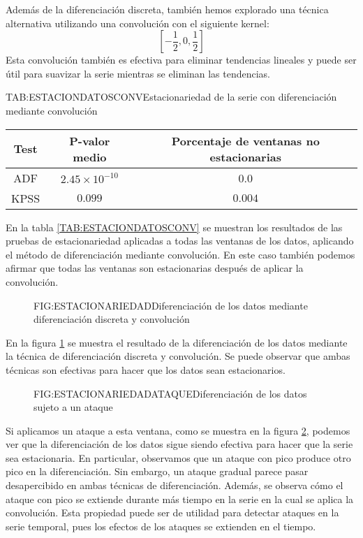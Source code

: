 Además de la diferenciación discreta, también hemos explorado una técnica alternativa utilizando una convolución con el siguiente kernel:
\[
[-\frac{1}{2}, 0, \frac{1}{2}]
\]
Esta convolución también es efectiva para eliminar tendencias lineales y puede ser útil para suavizar la serie mientras se eliminan las tendencias.

\begin{table}[Estacionariedad de la serie con diferenciación mediante convolución]{TAB:ESTACIONDATOSCONV}{Estacionariedad de la serie con diferenciación mediante convolución}
    \begin{tabular}{|c|c|c|}
        \hline
        \textbf{Test} & \textbf{P-valor medio} & \textbf{Porcentaje de ventanas no estacionarias} \\
        \hline
        ADF & $2.45\times 10^{-10}$ & 0.0 \\
        KPSS & $0.099$ & $0.004$ \\
        \hline
    \end{tabular}
\end{table}

En la tabla \ref{TAB:ESTACIONDATOSCONV} se muestran los resultados de las pruebas de estacionariedad aplicadas a todas las ventanas de los datos, aplicando el método de diferenciación mediante convolución. En este caso también podemos afirmar que todas las ventanas son estacionarias después de aplicar la convolución.

\begin{figure}[Diferenciación de los datos mediante diferenciación discreta y convolución]{FIG:ESTACIONARIEDAD}{Diferenciación de los datos mediante diferenciación discreta y convolución}
    \label{FIG:ESTACIONARIEDAD}
\end{figure}

En la figura \ref{FIG:ESTACIONARIEDAD} se muestra el resultado de la diferenciación de los datos mediante la técnica de diferenciación discreta y convolución. Se puede observar que ambas técnicas son efectivas para hacer que los datos sean estacionarios.

\begin{figure}[Diferenciación de los datos sujeto a un ataque]{FIG:ESTACIONARIEDADATAQUE}{Diferenciación de los datos sujeto a un ataque}
    \label{FIG:ESTACIONARIEDADATAQUE}
\end{figure}

Si aplicamos un ataque a esta ventana, como se muestra en la figura \ref{FIG:ESTACIONARIEDADATAQUE}, podemos ver que la diferenciación de los datos sigue siendo efectiva para hacer que la serie sea estacionaria. En particular, observamos que un ataque con pico produce otro pico en la diferenciación. Sin embargo, un ataque gradual parece pasar desapercibido en ambas técnicas de diferenciación. Además, se observa cómo el ataque con pico se extiende durante más tiempo en la serie en la cual se aplica la convolución. Esta propiedad puede ser de utilidad para detectar ataques en la serie temporal, pues los efectos de los ataques se extienden en el tiempo.
